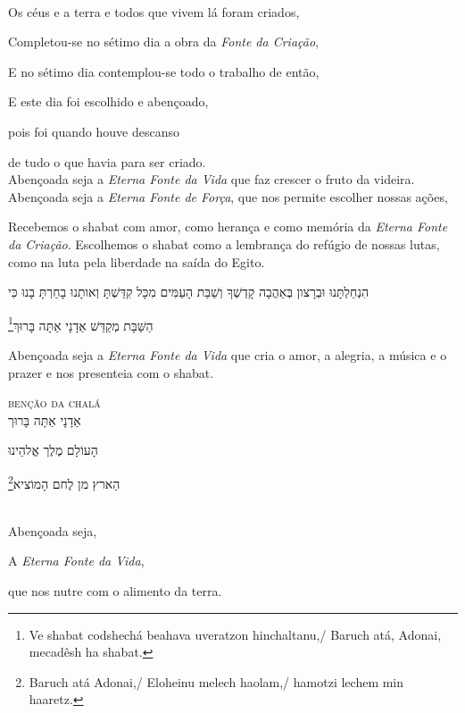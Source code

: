 \movetooddpage
\raggedright

\vspace*{1cm}

\textsc{}\\[15pt]

Os céus e a terra e todos que vivem lá foram criados,

Completou-se no sétimo dia a obra da \emph{Fonte da Criação},

E no sétimo dia contemplou-se todo o trabalho de então,

E este dia foi escolhido e abençoado,

pois foi quando houve descanso

de tudo o que havia para ser criado.\\[10pt]

Abençoada seja a \emph{Eterna Fonte da Vida} que faz crescer o \qb{}fruto da videira.\\[10pt]

Abençoada seja a \emph{Eterna Fonte de Força}, que nos permite \qb{}escolher nossas ações,

Recebemos o shabat com amor, como herança e como memória da \emph{Eterna
Fonte da Criação}. Escolhemos o shabat como a lembrança do refúgio de
nossas lutas, como na luta pela liberdade na saída do Egito.\\[10pt]


\movetoevenpage
\raggedleft

\vspace*{1cm}


הִנְחַלְתָּנוּ וּבְרָצון בְּאַהֲבָה קָדְשְׁךָ וְשַׁבַּת הָעַמִּים מִכָּל קִדַּשְׁתָּ וְאותָנוּ בָחַרְתָּ בָנוּ כִּי

הַשַּׁבָּת מְקַדֵּשׁ אַדָנָי אַתָּה בָּרוּךְ\footnote{Ve shabat codshechá beahava uveratzon hinchaltanu,/
Baruch atá, Adonai, mecadêsh ha shabat.}

\movetooddpage
\raggedright

\vspace*{1cm}


Abençoada seja a \emph{Eterna Fonte da Vida} que cria o amor, a alegria,
a música e o prazer e nos presenteia com o shabat.

\movetoevenpage
\raggedleft


\vspace*{1cm}

\textsc{benção da chalá}\\[15pt]

אַדָנָי אַתָּה בָּרוּך

הָעוֹלָם מֶלֶך אֱלהֵינוּ 

הַארץ מן לֶחם הָמוֹציא\footnote{Baruch atá Adonai,/ Eloheinu melech haolam,/ hamotzi lechem min haaretz.}

\movetooddpage
\raggedright

\vspace*{1cm}

\textsc{}\\[15pt]

Abençoada seja,

A \emph{Eterna Fonte da Vida}, 

que nos nutre com o alimento da terra.
